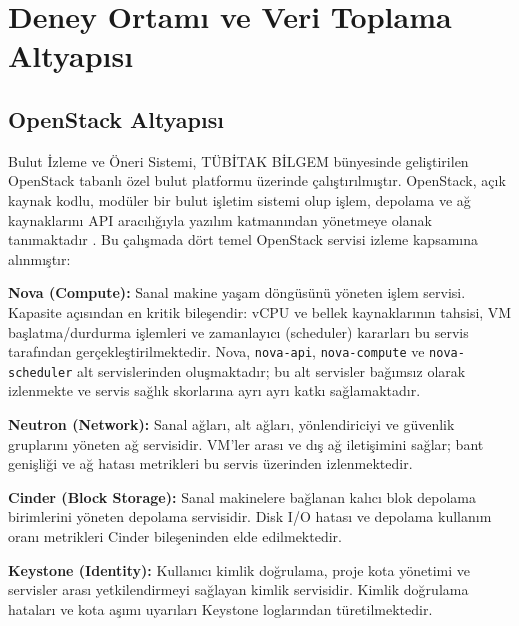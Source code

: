 \section{Deney Ortamı ve Veri Toplama Altyapısı}
\label{sec:ortam}

\subsection{OpenStack Altyapısı}

Bulut İzleme ve Öneri Sistemi, TÜBİTAK BİLGEM bünyesinde geliştirilen OpenStack tabanlı özel bulut platformu üzerinde çalıştırılmıştır.
OpenStack, açık kaynak kodlu, modüler bir bulut işletim sistemi olup işlem, depolama ve ağ kaynaklarını API aracılığıyla yazılım katmanından yönetmeye olanak tanımaktadır \autocite{openstack2024}.
Bu çalışmada dört temel OpenStack servisi izleme kapsamına alınmıştır:

\begin{maddelendir}[label=--]
    \item \textbf{Nova (Compute):} Sanal makine yaşam döngüsünü yöneten işlem servisi.
    Kapasite açısından en kritik bileşendir: vCPU ve bellek kaynaklarının tahsisi, VM başlatma/durdurma işlemleri ve zamanlayıcı (scheduler) kararları bu servis tarafından gerçekleştirilmektedir.
    Nova, \texttt{nova-api}, \texttt{nova-compute} ve \texttt{nova-scheduler} alt servislerinden oluşmaktadır; bu alt servisler bağımsız olarak izlenmekte ve servis sağlık skorlarına ayrı ayrı katkı sağlamaktadır.

    \item \textbf{Neutron (Network):} Sanal ağları, alt ağları, yönlendiriciyi ve güvenlik gruplarını yöneten ağ servisidir.
    VM'ler arası ve dış ağ iletişimini sağlar; bant genişliği ve ağ hatası metrikleri bu servis üzerinden izlenmektedir.

    \item \textbf{Cinder (Block Storage):} Sanal makinelere bağlanan kalıcı blok depolama birimlerini yöneten depolama servisidir.
    Disk I/O hatası ve depolama kullanım oranı metrikleri Cinder bileşeninden elde edilmektedir.

    \item \textbf{Keystone (Identity):} Kullanıcı kimlik doğrulama, proje kota yönetimi ve servisler arası yetkilendirmeyi sağlayan kimlik servisidir.
    Kimlik doğrulama hataları ve kota aşımı uyarıları Keystone loglarından türetilmektedir.
\end{maddelendir}

